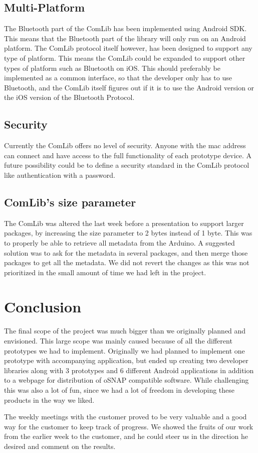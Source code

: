 \subsection{Multi-Platform}
The Bluetooth part of the ComLib has been implemented using Android SDK. This means that 
the Bluetooth part of the library will only run on an Android platform. The ComLib protocol
itself however, has been designed to support any type of platform. This means the ComLib
could be expanded to support other types of platform such as Bluetooth on iOS. This
should preferably be implemented as a common interface, so that the developer only has to use
Bluetooth, and the ComLib itself figures out if it is to use the Android version or the iOS version of
the Bluetooth Protocol.

\subsection{Security}
Currently the ComLib offers no level of security. Anyone with the mac address can connect
and have access to the full functionality of each prototype device. A future possibility could
be to define a security standard in the ComLib protocol like authentication with a password.

\subsection{ComLib's size parameter}
The ComLib was altered the last week before a presentation to support larger packages, by increasing the size parameter to 2 bytes instead of 1 byte. This was to properly
be able to retrieve all metadata from the Arduino. A suggested solution was to ask for the metadata
in several packages, and then merge those packages to get all the metadata. We did not revert the changes
as this was not prioritized in the small amount of time we had left in the project.

\section{Conclusion}
The final scope of the project was much bigger than we originally planned and envisioned. This large scope
was mainly caused because of all the different prototypes we had to implement. Originally we had planned
to implement one prototype with accompanying application, but ended up creating two developer libraries
along with 3 prototypes and 6 different Android applications in addition to a webpage for distribution of oSNAP
compatible software. While challenging this was also a lot of fun, since we had a lot of freedom in developing
these products in the way we liked.

The weekly meetings with the customer proved to be very valuable and
a good way for the customer to keep track of progress. We showed the fruits of our work from the earlier
week to the customer, and he could steer us in the direction he desired and comment on the results.
